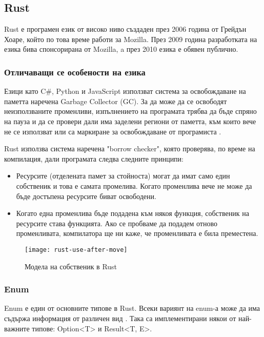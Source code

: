 \subsection{Rust}
Rust е програмен език от високо ниво създаден през 2006 година от Грейдън
Хоаре, който по това време работи за Mozilla. През 2009 година разработката на
езика бива спонсорирана от Mozilla, a през 2010 езика е обявен публично.
\cite{Rust_Origins_Wikipedia}

\subsubsection{Отличаващи се особености на езика}
Езици като C\#, Python и JavaScript използват система за освобождаване на паметта
наречена Garbage Collector (GC). За да може да се освободят неизползваните
променливи, изпълнението на програмата трябва да бъде спряно на пауза и да се
провери дали има заделени региони от паметта, към които вече не се използват
или са маркиране за освобождаване от програмиста \cite{Garbage_Collection_Wikipedia}.

Rust използва система наречена "borrow checker", която проверява, по време на
компилация, дали програмата следва следните принципи:

\begin{itemize}
    \item Ресурсите (отделената памет за стойноста) могат да имат само един
        собственик и това е самата промелива. Когато променлива вече не може да бъде
        достъпена ресурсите биват освободени.

    \item Когато една променлива бъде подадена към някоя функция, собственик на
        ресурсите става функцията. Ако се пробваме да подадем отново променливата,
        компилатора ще ни каже, че променливата е била преместена.
\end{itemize}

\begin{figure}[!htb]
  \texttt{[image: rust-use-after-move]}
  \centering
  \caption{Модела на собственик в Rust}
  \label{fig:rust-use-after-move}
\end{figure}

\subsubsection{Enum}
Enum е един от основните типове в Rust. Всеки вариянт на enum-а може да има
съдържа информация от различен вид \cite{Rust_Enums}. Така са имплементирани
някои от най-важните типове: Option<T> и Result<T, E>.

